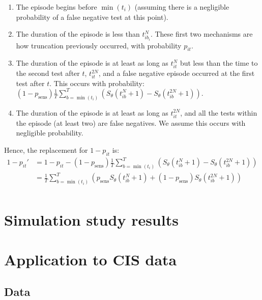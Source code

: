 \documentclass[thesis.tex]{subfiles}
\begin{document}
\begin{enumerate}
\item
  The episode begins before $\min(t_i)$ (assuming there is a
  negligible probability of a false negative test at this point).
\item
  The duration of the episode is less than $t_{ib_i}^N$. These first
  two mechanisms are how truncation previously occurred, with
  probability $p_{it}$.
\item
  The duration of the episode is at least as long as $t_{it}^N$ but
  less than the time to the second test after $t$, $t_{it}^{2N}$,
  and a false negative episode occurred at the first test after $t$.
  This occurs with probability:
  \begin{math}
    (1 - p_\text{sens})\frac{1}{T} \sum_{b=\min(t_i)}^T \left( S_\theta(t_{ib}^N + 1) - S_\theta(t_{ib}^{2N} + 1)\right).
  \end{math}
\item
  The duration of the episode is at least as long as $t_{it}^{2N}$,
  and all the tests within the episode (at least two) are false
  negatives. We assume this occurs with negligible probability.
\end{enumerate}

Hence, the replacement for $1 - p_{it}$ is:
\begin{align}
1 - p_{it}'
&= 1 - p_{it} - (1 - p_\text{sens})\frac{1}{T} \sum_{b=\min(t_i)}^T \left( S_\theta(t_{ib}^N + 1) - S_\theta(t_{ib}^{2N} + 1)\right) \\
&= \frac{1}{T} \sum_{b=\min(t_i)}^T \left( p_\text{sens} S_\theta(t_{ib}^N + 1) + (1 - p_\text{sens}) S_\theta(t_{ib}^{2N} + 1)\right) \\
\end{align}

\section{Simulation study results} \label{imperf-test:sec:sim-study-results}

\section{Application to CIS data} \label{imperf-test:sec:application}

\subsection{Data}
\end{document}

